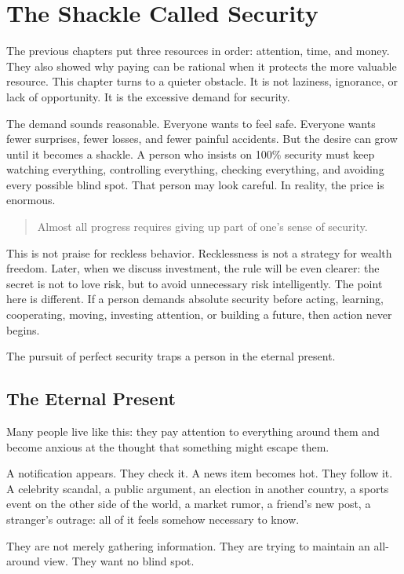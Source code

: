 \chapter{The Shackle Called Security}

The previous chapters put three resources in order: attention, time, and money. They also showed why paying can be rational when it protects the more valuable resource. This chapter turns to a quieter obstacle. It is not laziness, ignorance, or lack of opportunity. It is the excessive demand for security.

The demand sounds reasonable. Everyone wants to feel safe. Everyone wants fewer surprises, fewer losses, and fewer painful accidents. But the desire can grow until it becomes a shackle. A person who insists on 100\% security must keep watching everything, controlling everything, checking everything, and avoiding every possible blind spot. That person may look careful. In reality, the price is enormous.

\begin{quote}
Almost all progress requires giving up part of one's sense of security.
\end{quote}

This is not praise for reckless behavior. Recklessness is not a strategy for wealth freedom. Later, when we discuss investment, the rule will be even clearer: the secret is not to love risk, but to avoid unnecessary risk intelligently. The point here is different. If a person demands absolute security before acting, learning, cooperating, moving, investing attention, or building a future, then action never begins.

The pursuit of perfect security traps a person in the eternal present.

\section*{The Eternal Present}

Many people live like this: they pay attention to everything around them and become anxious at the thought that something might escape them.

A notification appears. They check it. A news item becomes hot. They follow it. A celebrity scandal, a public argument, an election in another country, a sports event on the other side of the world, a market rumor, a friend's new post, a stranger's outrage: all of it feels somehow necessary to know.

They are not merely gathering information. They are trying to maintain an all-around view. They want no blind spot.

